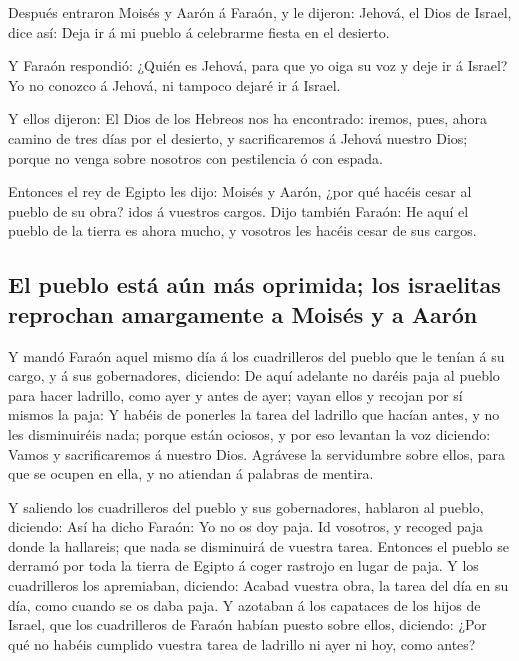  Después entraron Moisés y Aarón á Faraón, y le dijeron:
Jehová, el Dios de Israel, dice así: Deja ir á mi pueblo á celebrarme
fiesta en el desierto.

 Y Faraón respondió: ¿Quién es Jehová, para que yo oiga su
voz y deje ir á Israel? Yo no conozco á Jehová, ni tampoco dejaré ir á
Israel.

 Y ellos dijeron: El Dios de los Hebreos nos ha
encontrado: iremos, pues, ahora camino de tres días por el desierto, y
sacrificaremos á Jehová nuestro Dios; porque no venga sobre nosotros con
pestilencia ó con espada.

 Entonces el rey de Egipto les dijo: Moisés y Aarón, ¿por
qué hacéis cesar al pueblo de su obra? idos á vuestros cargos.
 Dijo también Faraón: He aquí el pueblo de la tierra es
ahora mucho, y vosotros les hacéis cesar de sus cargos.

\hypertarget{el-pueblo-estuxe1-auxfan-muxe1s-oprimida-los-israelitas-reprochan-amargamente-a-moisuxe9s-y-a-aaruxf3n}{%
\subsection{El pueblo está aún más oprimida; los israelitas reprochan
amargamente a Moisés y a
Aarón}\label{el-pueblo-estuxe1-auxfan-muxe1s-oprimida-los-israelitas-reprochan-amargamente-a-moisuxe9s-y-a-aaruxf3n}}

 Y mandó Faraón aquel mismo día á los cuadrilleros del
pueblo que le tenían á su cargo, y á sus gobernadores, diciendo:
 De aquí adelante no daréis paja al pueblo para hacer
ladrillo, como ayer y antes de ayer; vayan ellos y recojan por sí mismos
la paja:  Y habéis de ponerles la tarea del ladrillo que
hacían antes, y no les disminuiréis nada; porque están ociosos, y por
eso levantan la voz diciendo: Vamos y sacrificaremos á nuestro Dios.
 Agrávese la servidumbre sobre ellos, para que se ocupen
en ella, y no atiendan á palabras de mentira.

 Y saliendo los cuadrilleros del pueblo y sus
gobernadores, hablaron al pueblo, diciendo: Así ha dicho Faraón: Yo no
os doy paja.  Id vosotros, y recoged paja donde la
hallareis; que nada se disminuirá de vuestra tarea. 
Entonces el pueblo se derramó por toda la tierra de Egipto á coger
rastrojo en lugar de paja.  Y los cuadrilleros los
apremiaban, diciendo: Acabad vuestra obra, la tarea del día en su día,
como cuando se os daba paja.  Y azotaban á los capataces
de los hijos de Israel, que los cuadrilleros de Faraón habían puesto
sobre ellos, diciendo: ¿Por qué no habéis cumplido vuestra tarea de
ladrillo ni ayer ni hoy, como antes?

